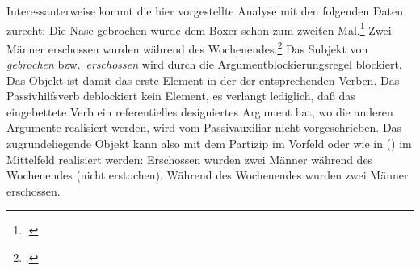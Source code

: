 Interessanterweise kommt die hier vorgestellte Analyse mit den folgenden Daten zurecht:
\eal
\label{bsp-subjekt-im-vf-passiv}
\ex{}
Die Nase gebrochen wurde dem Boxer schon zum zweiten Mal.\footnote{
        .
}
\ex{}
Zwei Männer erschossen wurden    während des Wochenendes.\footnote{
        .%
        }
\label{bsp-subjekt-im-vf-passiv-letzt}
\zl
Das Subjekt von \emph{gebrochen} bzw.\ \emph{erschossen} %
wird durch die Argumentblockierungsregel blockiert. Das Objekt ist damit das erste
Element in der \subcatl der entsprechenden Verben. Das Passivhilfsverb deblockiert kein
Element, es verlangt lediglich, daß das eingebettete Verb ein referentielles designiertes Argument
hat, wo die anderen Argumente realisiert werden, wird vom Passivauxiliar nicht vorgeschrieben.
Das zugrundeliegende Objekt kann also mit dem Partizip im Vorfeld oder wie in ()
im Mittelfeld realisiert werden:
\eal
\ex Erschossen wurden zwei Männer während des Wochenendes (nicht erstochen).
\ex Während des Wochenendes wurden zwei Männer erschossen.
\zl

